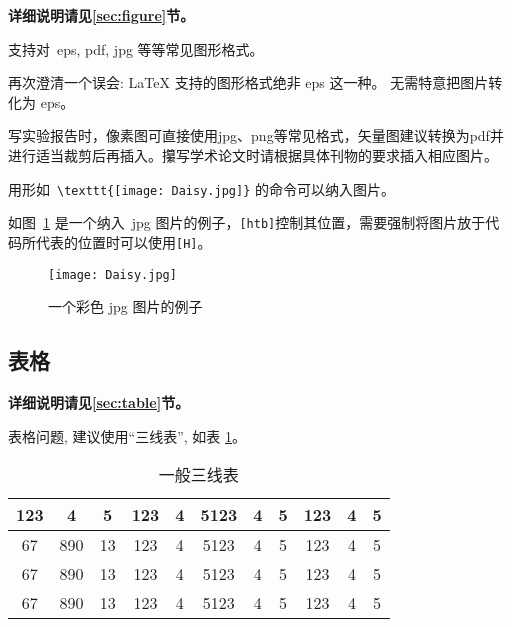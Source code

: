 \textbf{详细说明请见\ref{sec:figure}节。}

支持对~eps, pdf, jpg 等等常见图形格式。

再次\colorbox{red!45}{澄清一个误会}: \LaTeX{} 支持的图形格式绝非 eps 这一种。 无需特意把图片转化为 eps。

写实验报告时，像素图可直接使用jpg、png等常见格式，矢量图建议转换为pdf并进行适当裁剪后再插入。攥写学术论文时请根据具体刊物的要求插入相应图片。

用形如~\verb|\texttt{[image: Daisy.jpg]}| 的命令可以纳入图片。

如图~\ref{fig:1} 是一个纳入~jpg 图片的例子，\verb|[htb]|控制其位置，需要强制将图片放于代码所代表的位置时可以使用\verb|[H]|。

\begin{figure}[H]
\centering
  \texttt{[image: Daisy.jpg]}
  \caption{一个彩色 jpg 图片的例子}
  \label{fig:1}
\end{figure}

\subsection{表格}

\textbf{详细说明请见\ref{sec:table}节。}

表格问题, 建议使用“三线表”, 如表 \ref{tab:1}。

\begin{table}[htb]
\centering
\caption{一般三线表}
\label{tab:1}
    \begin{tabular}{c c c c c c c c c c c}
    \hline
    123 & 4  & 5  & 123 & 4 & 5123 & 4 & 5 & 123 & 4 & 5\\
    \hline
    67 & 890 & 13 & 123 & 4 & 5123 & 4 & 5 & 123 & 4 & 5\\
    67 & 890 & 13 & 123 & 4 & 5123 & 4 & 5 & 123 & 4 & 5\\
    67 & 890 & 13 & 123 & 4 & 5123 & 4 & 5 & 123 & 4 & 5\\
    \hline
    \end{tabular}
\end{table}
